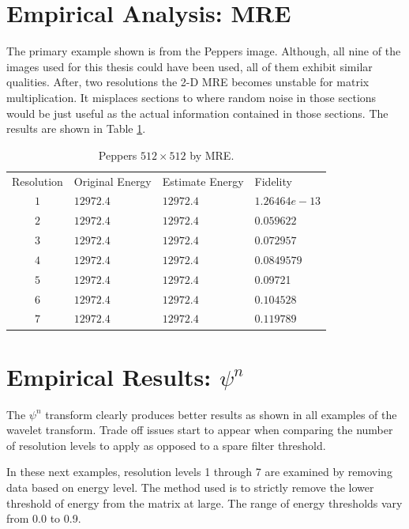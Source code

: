\section {Empirical Analysis: MRE}

The primary example shown is from the Peppers image.  Although, all nine of the images used for this thesis could have been used, all of them exhibit similar qualities.   After, two resolutions the 2-D MRE becomes unstable for matrix multiplication.  It misplaces sections to where random noise in those sections would be just useful as the actual information contained in those sections.  The results are shown in Table \ref{tbl:peppers_mre}.

\begin{table}\caption{\label{tbl:peppers_mre}
Peppers $512 \times 512$ by MRE.}
\begin{center}
\begin{tabular}{clll}
{ Resolution } &  {Original Energy } &{ Estimate Energy }  & {Fidelity} \\ 
$1$ & $12972.4$ &  $12972.4$ &  $1.26464e-13$\\ 
$2$ & $12972.4$ & $12972.4$ &  $0.059622$ \\ 
$3$ & $12972.4$ & $12972.4$ &  $0.072957$  \\ 
$4$& $12972.4$  & $12972.4$  & $0.0849579$  \\ 
$5$& $12972.4$  & $12972.4$  & 0.09721  \\ 
$6$& $12972.4$  & $12972.4$ &  $0.104528$  \\ 
$7$& $12972.4$  & $12972.4$ &  $0.119789$  \\ 
\end{tabular}
\end{center}

\end{table}

\section {Empirical Results: $\psi^n$}

The $\psi^n$ transform clearly produces better results as shown in all examples of the wavelet transform.  Trade off issues start to appear when comparing the number of resolution levels to apply as opposed to a spare filter threshold.   

In these next examples, resolution levels 1 through 7 are examined by removing data based on energy level.  The method used is to strictly remove the lower threshold of energy from the matrix at large.  %
The range of energy thresholds vary from 0.0 to 0.9.


